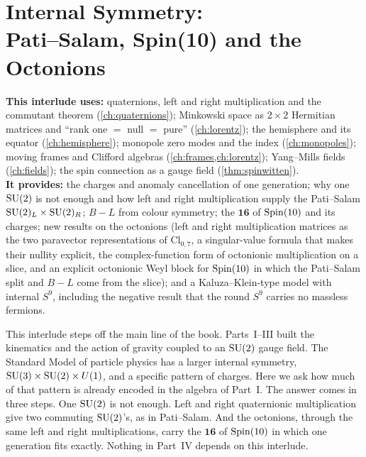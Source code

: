 \chapter[Internal Symmetry: Pati--Salam, Spin(10) and the Octonions]{Internal Symmetry:\\ Pati--Salam, Spin(10) and the Octonions}
\label{ch:intA}

\begin{usesbox}
\textbf{This interlude uses:} quaternions, left and right multiplication and the commutant theorem (\cref{ch:quaternions}); Minkowski space as $2\times2$ Hermitian matrices and ``rank one $=$ null $=$ pure'' (\cref{ch:lorentz}); the hemisphere and its equator (\cref{ch:hemisphere}); monopole zero modes and the index (\cref{ch:monopoles}); moving frames and Clifford algebras (\cref{ch:frames,ch:lorentz}); Yang--Mills fields (\cref{ch:fields}); the spin connection as a gauge field (\cref{thm:spinwitten}).\\
\textbf{It provides:} the charges and anomaly cancellation of one generation; why one $\mathrm{SU}(2)$ is not enough and how left and right multiplication supply the Pati--Salam $\mathrm{SU}(2)_L\times\mathrm{SU}(2)_R$; $B-L$ from colour symmetry; the $\mathbf{16}$ of $\mathrm{Spin}(10)$ and its charges; new results on the octonions (left and right multiplication matrices as the two paravector representations of $\mathrm{Cl}_{0,7}$, a singular-value formula that makes their nullity explicit, the complex-function form of octonionic multiplication on a slice, and an explicit octonionic Weyl block for $\mathrm{Spin}(10)$ in which the Pati--Salam split and $B-L$ come from the slice); and a Kaluza--Klein-type model with internal $S^9$, including the negative result that the round $S^9$ carries no massless fermions.
\end{usesbox}

This interlude steps off the main line of the book. Parts~I--III built the kinematics and the action of gravity coupled to an $\mathrm{SU}(2)$ gauge field. The Standard Model of particle physics has a larger internal symmetry, $\mathrm{SU}(3)\times\mathrm{SU}(2)\times U(1)$, and a specific pattern of charges. Here we ask how much of that pattern is already encoded in the algebra of Part~I. The answer comes in three steps. One $\mathrm{SU}(2)$ is not enough. Left and right quaternionic multiplication give two commuting $\mathrm{SU}(2)$'s, as in Pati--Salam. And the octonions, through the same left and right multiplications, carry the $\mathbf{16}$ of $\mathrm{Spin}(10)$ in which one generation fits exactly. Nothing in Part~IV depends on this interlude.

